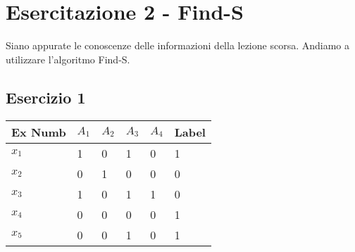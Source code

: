 \section{Esercitazione 2 - Find-S }
Siano appurate le conoscenze delle informazioni della lezione scorsa. Andiamo a utilizzare l'algoritmo Find-S.

\subsection{Esercizio 1}

\begin{table}[h]
\centering
\begin{tabular}{|l|l|l|l|l|l|}
\hline
\textbf{Ex Numb} & \textbf{$A_1$} & \textbf{$A_2$} & \textbf{$A_3$} & \textbf{$A_4$} & \textbf{Label} \\ \hline
\textbf{$x_1$}     & 1            & 0            & 1            & 0            & 1              \\ \hline
\textbf{$x_2$}     & 0            & 1            & 0            & 0            & 0              \\ \hline
\textbf{$x_3$}     & 1            & 0            & 1            & 1            & 0              \\ \hline
\textbf{$x_4$}     & 0            & 0            & 0            & 0            & 1              \\ \hline
\textbf{$x_5$}     & 0            & 0            & 1            & 0            & 1              \\ \hline
\end{tabular}
\end{table}

